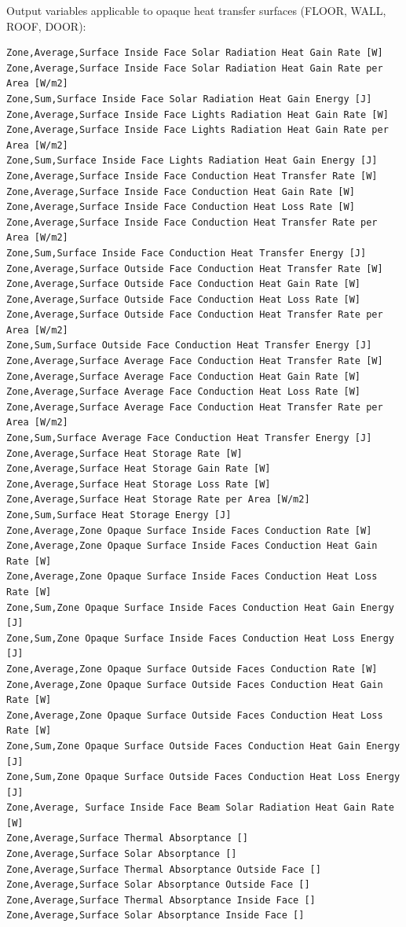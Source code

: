 Output variables applicable to opaque heat transfer surfaces (FLOOR, WALL, ROOF, DOOR):

\begin{lstlisting}
Zone,Average,Surface Inside Face Solar Radiation Heat Gain Rate [W]
Zone,Average,Surface Inside Face Solar Radiation Heat Gain Rate per Area [W/m2]
Zone,Sum,Surface Inside Face Solar Radiation Heat Gain Energy [J]
Zone,Average,Surface Inside Face Lights Radiation Heat Gain Rate [W]
Zone,Average,Surface Inside Face Lights Radiation Heat Gain Rate per Area [W/m2]
Zone,Sum,Surface Inside Face Lights Radiation Heat Gain Energy [J]
Zone,Average,Surface Inside Face Conduction Heat Transfer Rate [W]
Zone,Average,Surface Inside Face Conduction Heat Gain Rate [W]
Zone,Average,Surface Inside Face Conduction Heat Loss Rate [W]
Zone,Average,Surface Inside Face Conduction Heat Transfer Rate per Area [W/m2]
Zone,Sum,Surface Inside Face Conduction Heat Transfer Energy [J]
Zone,Average,Surface Outside Face Conduction Heat Transfer Rate [W]
Zone,Average,Surface Outside Face Conduction Heat Gain Rate [W]
Zone,Average,Surface Outside Face Conduction Heat Loss Rate [W]
Zone,Average,Surface Outside Face Conduction Heat Transfer Rate per Area [W/m2]
Zone,Sum,Surface Outside Face Conduction Heat Transfer Energy [J]
Zone,Average,Surface Average Face Conduction Heat Transfer Rate [W]
Zone,Average,Surface Average Face Conduction Heat Gain Rate [W]
Zone,Average,Surface Average Face Conduction Heat Loss Rate [W]
Zone,Average,Surface Average Face Conduction Heat Transfer Rate per Area [W/m2]
Zone,Sum,Surface Average Face Conduction Heat Transfer Energy [J]
Zone,Average,Surface Heat Storage Rate [W]
Zone,Average,Surface Heat Storage Gain Rate [W]
Zone,Average,Surface Heat Storage Loss Rate [W]
Zone,Average,Surface Heat Storage Rate per Area [W/m2]
Zone,Sum,Surface Heat Storage Energy [J]
Zone,Average,Zone Opaque Surface Inside Faces Conduction Rate [W]
Zone,Average,Zone Opaque Surface Inside Faces Conduction Heat Gain Rate [W]
Zone,Average,Zone Opaque Surface Inside Faces Conduction Heat Loss Rate [W]
Zone,Sum,Zone Opaque Surface Inside Faces Conduction Heat Gain Energy [J]
Zone,Sum,Zone Opaque Surface Inside Faces Conduction Heat Loss Energy [J]
Zone,Average,Zone Opaque Surface Outside Faces Conduction Rate [W]
Zone,Average,Zone Opaque Surface Outside Faces Conduction Heat Gain Rate [W]
Zone,Average,Zone Opaque Surface Outside Faces Conduction Heat Loss Rate [W]
Zone,Sum,Zone Opaque Surface Outside Faces Conduction Heat Gain Energy [J]
Zone,Sum,Zone Opaque Surface Outside Faces Conduction Heat Loss Energy [J]
Zone,Average, Surface Inside Face Beam Solar Radiation Heat Gain Rate [W]
Zone,Average,Surface Thermal Absorptance []
Zone,Average,Surface Solar Absorptance []
Zone,Average,Surface Thermal Absorptance Outside Face []
Zone,Average,Surface Solar Absorptance Outside Face []
Zone,Average,Surface Thermal Absorptance Inside Face []
Zone,Average,Surface Solar Absorptance Inside Face []
\end{lstlisting}

